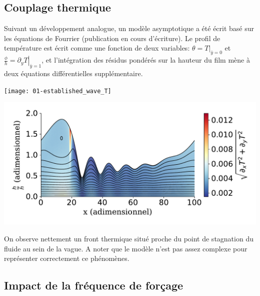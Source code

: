 \documentclass[a0,portrait]{a0poster}
\begin{document}
\begin{multicols}{2}
    \subsection*{Couplage thermique}
    Suivant un développement analogue, un modèle asymptotique a été écrit basé sur les équations de Fourrier (publication en cours d'écriture). Le profil de température est écrit comme une fonction de deux variables: $\theta = T|_{\bar{y}=0}$ et $\frac{\phi}{h} = \left.\partial_{y}T\right|_{\bar{y}=1}$, et l'intégration des résidus pondérés sur la hauteur du film mène à deux équations différentielles supplémentaire.

    \begin{multicols}{2}
        \begin{center}
            \texttt{[image: 01-established\_wave\_T]}
            \label{fig:thermal}
        \end{center}
        \columnbreak
        \begin{center}
            \includegraphics[width=0.98\columnwidth]{01-established_wave_Tmag_streamlines}
            \label{fig:streamlines_thermal}
        \end{center}
    \end{multicols}

    On observe nettement un front thermique situé proche du point de stagnation du fluide au sein de la vague. A noter que le modèle n'est pas assez complexe pour représenter correctement ce phénomènes.

    \columnbreak

    \subsection*{Impact de la fréquence de forçage}


\end{multicols}
\end{document}

